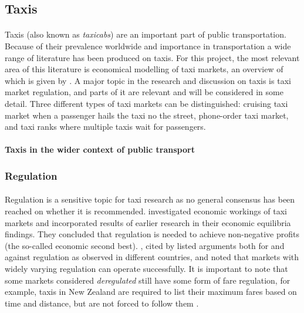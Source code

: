 \subsection{Taxis}
\label{sec:taxis}

\paragraph{} Taxis (also known as \textit{taxicabs}) are an important part of
public transportation. Because of their prevalence worldwide and importance in
transportation a wide range of literature has been produced on taxis. For this
project, the most relevant area of this literature is economical modelling of
taxi markets, an overview of which is given by
\textcite{Salanova2011taxi+review}. A major topic in the research and
discussion on taxis is taxi market regulation, and parts of it are relevant and
will be considered in some detail. Three different types of taxi markets can be
distinguished: cruising taxi market when a passenger hails the taxi no the
street, phone-order taxi market, and taxi ranks where multiple taxis wait for
passengers.

\paragraph{Taxis in the wider context of public transport} 

\subsubsection{Regulation}

\paragraph{}Regulation is a sensitive topic for taxi research as no general
consensus has been reached on whether it is recommended.
\textcite{Cairns1996taxi+competition} investigated economic workings of taxi
markets and incorporated results of earlier research in their economic
equilibria findings. They concluded that regulation is needed to achieve 
non-negative profits (the so-called economic second best).
\textcite{Oecd2007taxi+policy}, cited by \textcite{Salanova2011taxi+review}
listed arguments both for and against regulation as observed in different
countries, and noted that markets with widely varying regulation can operate
successfully. It is important to note that some markets considered
\textit{deregulated} still have some form of fare regulation, for example,
taxis in New Zealand are required to list their maximum fares based on time and
distance, but are not forced to follow them
\parencite{Gaunt1995taxi+newzealand}.

